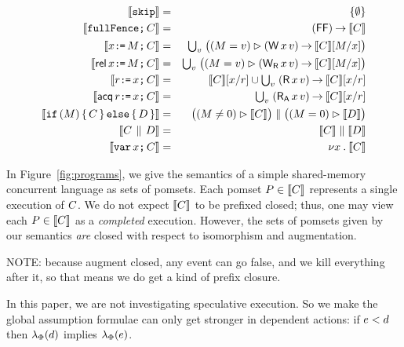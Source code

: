 \begin{figure*}
\begin{eqnarray*}
  \sem{\SKIP} & = & \{ \emptyset \} \\
  \sem{\FENCE\SEMI \aCmd} & = & (\DF) \prefix \sem{\aCmd} \\
  \sem{\aLoc\GETS\aExp\SEMI \aCmd} & = & \textstyle\bigcup_\aVal\; \bigl((\aExp=\aVal) \guard (\DW\aLoc\aVal) \prefix \sem{\aCmd}[\aExp/\aLoc]\bigr) \\
  \sem{\REL\aLoc\GETS\aExp\SEMI \aCmd} & = & \textstyle\bigcup_\aVal\; \bigl((\aExp=\aVal) \guard (\DWRel\aLoc\aVal) \prefix \sem{\aCmd}[\aExp/\aLoc]\bigr) \\
  \sem{\aReg\GETS\aLoc\SEMI \aCmd} & = & \sem{\aCmd}[\aLoc/\aReg] \cup \textstyle\bigcup_\aVal\; (\DR\aLoc\aVal) \prefix \sem{\aCmd}[\aLoc/\aReg] \\
  \sem{\ACQ\aReg\GETS\aLoc\SEMI \aCmd} & = & \textstyle\bigcup_\aVal\; (\DRAcq\aLoc\aVal) \prefix \sem{\aCmd}[\aLoc/\aReg] \\
  \sem{\IF (\aExp) \THEN \aCmd \ELSE \bCmd \FI} & = & \bigl((\aExp \neq 0) \guard \sem{\aCmd}\bigr) \parallel \bigl((\aExp=0) \guard \sem{\bCmd}\bigr) \\
  \sem{\aCmd \PAR \bCmd} & = & \sem{\aCmd} \parallel \sem{\bCmd} \\
  \sem{\VAR\aLoc\SEMI \aCmd} & = & \nu \aLoc \st \sem{\aCmd}
\end{eqnarray*}
\caption{Semantics of a concurrent shared-memory language}
\label{fig:programs}
\end{figure*}

In Figure~\ref{fig:programs}, we give the semantics of a simple shared-memory
concurrent language as sets of pomsets.  
Each pomset
$P\in\llbracket C\rrbracket$ represents a single execution of $C$.  We do not
expect $\llbracket C\rrbracket$ to be prefixed closed; thus, one may view each
$P\in\llbracket C\rrbracket$ as a \emph{completed} execution.  However, the sets of
pomsets given by our semantics \emph{are} closed with respect to
isomorphism and augmentation.

NOTE: because augment closed, any event can go false, and we kill everything
after it, so that means we do get a kind of prefix closure.

In this paper, we are not investigating speculative execution.  So we make
the global assumption formulae can only get stronger in dependent actions:
if $e<d$ then
$\lambda_{\Phi}(d)$ implies $\lambda_{\Phi}(e)$.
 

